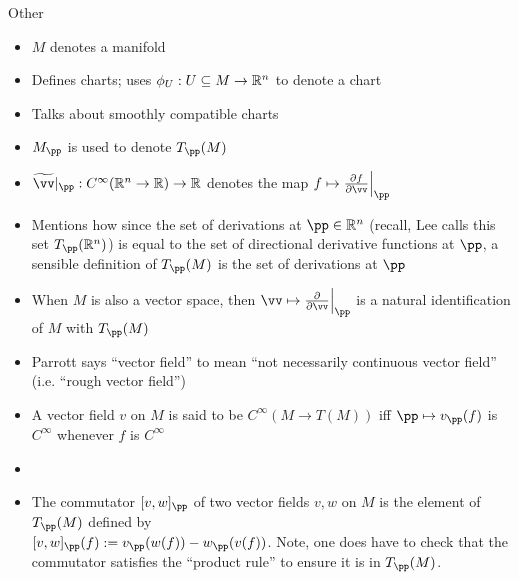 \documentclass{article}
\begin{document}
Other

\begin{itemize}
    \item $M$ denotes a manifold
    \item Defines charts; uses $\phi_U:U \subseteq M \rightarrow \mathbb{R}^n$ to denote a chart
    \item Talks about smoothly compatible charts 
    \item $M_\pp$ is used to denote $T_\pp(M)$
    \item $\widetilde{\vv}|_\pp:C^\infty(\R^n \rightarrow \R) \rightarrow \R$ denotes the map $f \mapsto \frac{\pd f}{\pd \vv}\Big|_\pp$
    \item Mentions how since the set of derivations at $\pp \in \R^n$ (recall, Lee calls this set $T_\pp(\R^n)$) is equal to the set of directional derivative functions at $\pp$, a sensible definition of $T_\pp(M)$ is the set of derivations at $\pp$
    \item When $M$ is also a vector space, then $\vv \mapsto \frac{\pd}{\pd \vv}\Big|_\pp$ is a natural identification of $M$ with $T_\pp(M)$
    \item Parrott says ``vector field'' to mean ``not necessarily continuous vector field'' (i.e. ``rough vector field'')
    \item A vector field $v$ on $M$ is said to be $C^\infty(M \rightarrow T(M))$ iff $\pp \mapsto v_\pp(f)$ is $C^\infty$ whenever $f$ is $C^\infty$ 
    \item 
    \item The commutator $[v, w]_\pp$ of two vector fields $v, w$ on $M$ is the element of $T_\pp(M)$ defined by \\ ${[v, w]_\pp(f) := v_\pp(w(f)) - w_\pp(v(f))}$. Note, one does have to check that the commutator satisfies the ``product rule'' to ensure it is in $T_\pp(M)$.
\end{itemize}
\end{document}
